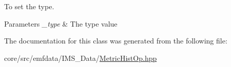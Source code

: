 To set the type. 


\begin{DoxyParams}{Parameters}
{\em \_\-type} & The type value \\
\hline
\end{DoxyParams}


The documentation for this class was generated from the following file:\begin{DoxyCompactItemize}
\item 
core/src/emfdata/IMS\_\-Data/\hyperlink{MetricHistOp_8hpp}{MetricHistOp.hpp}\end{DoxyCompactItemize}
